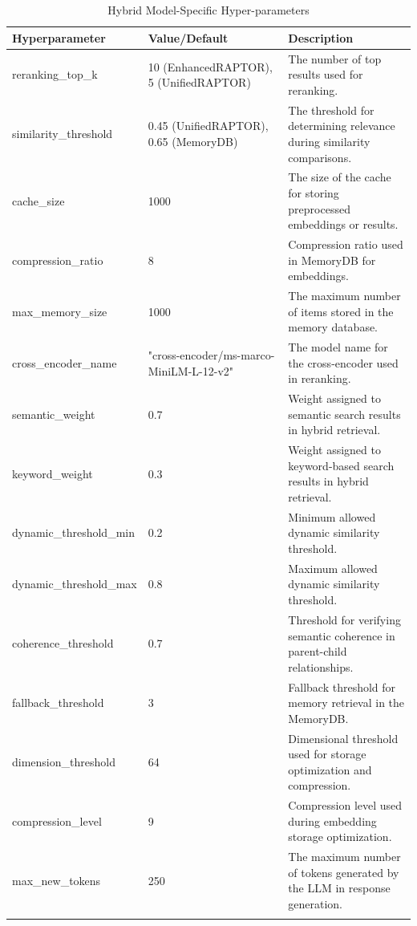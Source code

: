 \documentclass[pdflatex,sn-mathphys-num]{sn-jnl}%
\begin{document}
\begin{appendices}


\section{}\label{secA1}

\begin{table}[h]
\caption{Hybrid Model-Specific Hyper-parameters}\label{tab:hyperparameters}%
\begin{tabular}{@{}p{}p{}p{}@{}}
\toprule
\textbf{Hyperparameter} & \textbf{Value/Default} & \textbf{Description} \\
\midrule
reranking\_top\_k & 10 (EnhancedRAPTOR), 5 (UnifiedRAPTOR) & The number of top results used for reranking. \\
similarity\_threshold & 0.45 (UnifiedRAPTOR), 0.65 (MemoryDB) & The threshold for determining relevance during similarity comparisons. \\
cache\_size & 1000 & The size of the cache for storing preprocessed embeddings or results. \\
compression\_ratio & 8 & Compression ratio used in MemoryDB for embeddings. \\
max\_memory\_size & 1000 & The maximum number of items stored in the memory database. \\
cross\_encoder\_name & "cross-encoder/ms-marco-MiniLM-L-12-v2" & The model name for the cross-encoder used in reranking. \\
semantic\_weight & 0.7 & Weight assigned to semantic search results in hybrid retrieval. \\
keyword\_weight & 0.3 & Weight assigned to keyword-based search results in hybrid retrieval. \\
dynamic\_threshold\_min & 0.2 & Minimum allowed dynamic similarity threshold. \\
dynamic\_threshold\_max & 0.8 & Maximum allowed dynamic similarity threshold. \\
coherence\_threshold & 0.7 & Threshold for verifying semantic coherence in parent-child relationships. \\
fallback\_threshold & 3 & Fallback threshold for memory retrieval in the MemoryDB. \\
dimension\_threshold & 64 & Dimensional threshold used for storage optimization and compression. \\
compression\_level & 9 & Compression level used during embedding storage optimization. \\
max\_new\_tokens & 250 & The maximum number of tokens generated by the LLM in response generation. \\
\botrule
\end{tabular}
\end{table}




\end{appendices}
\end{document}
